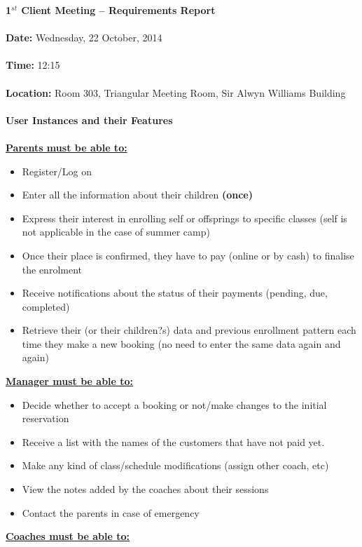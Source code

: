 \documentclass{l3proj}
\begin{document}
\textbf{\LARGE{1$^{st}$ Client Meeting -- Requirements Report}}\\
\\
\textbf{Date:} Wednesday, 22 October, 2014\\
\\
\textbf{Time:} 12:15\\
\\
\textbf{Location:} Room 303, Triangular Meeting Room, Sir Alwyn Williams Building\\
\\
\textbf{\Large{User Instances and their Features}}\\
\\
\textbf{\underline{Parents must be able to:}}
	\begin{itemize}
	\item Register/Log on
	\item Enter all the information about their children \textbf{(once)}
	\item Express their interest in enrolling self or offsprings to specific classes (self is not applicable in the case of summer camp)
	\item Once their place is confirmed, they have to pay (online or by cash) to finalise the enrolment
	\item Receive notifications about the status of their payments (pending, due, completed)
	\item Retrieve their (or their children?s) data and previous enrollment pattern each time they make a new booking (no need to enter the same data again and again)
	\end{itemize}
\textbf{\underline{Manager must be able to:}}
	\begin{itemize}
	\item Decide whether to accept a booking or not/make changes to the initial reservation
	\item Receive a list with the names of the customers that have not paid yet.
	\item Make any kind of class/schedule modifications (assign other coach, etc)
	\item View the notes added by the coaches about their sessions
	\item Contact the parents in case of emergency
	\end{itemize}
\textbf{\underline{Coaches must be able to:}}
\end{document}
